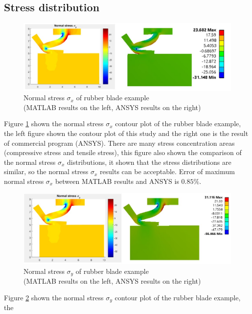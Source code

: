 \subsection{Stress distribution}
\begin{figure}[H]
    \centering
    \includegraphics[scale=0.63]{Figures/sx_rub_MvsA.jpg}
    \decoRule
    \caption{Normal stress $\sigma_x$ of rubber blade example \\(MATLAB results on the left, ANSYS results on the right)}
    \label{fig:sx_rub_MvsA}
\end{figure} \noindent
Figure \ref{fig:sx_rub_MvsA} shown the normal stress $\sigma_x$ contour plot of the rubber blade example,
the left figure shown the contour plot of this study and the right one is the result of
commercial program (ANSYS). There are many stress concentration areas (compressive
stress and tensile stress), this figure also shown the comparison of the normal stress $\sigma_x$
distributions, it shown that the stress distributions are similar, so the normal
stress $\sigma_x$ results can be acceptable.
Error of maximum normal stress $\sigma_x$ between MATLAB results and ANSYS is $0.85\%$.
\newline
\begin{figure}[H]
    \centering
    \includegraphics[scale=0.65]{Figures/sy_rub_MvsA.jpg}
    \decoRule
    \caption{Normal stress $\sigma_y$ of rubber blade example \\(MATLAB results on the left, ANSYS results on the right)}
    \label{fig:sy_rub_MvsA}
\end{figure} \noindent
\noindent
Figure \ref{fig:sy_rub_MvsA} shown the normal stress $\sigma_y$ contour plot of the rubber blade example, the
